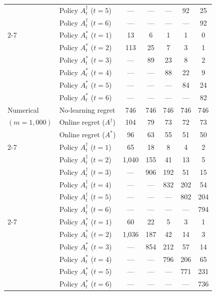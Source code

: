 \documentclass[11pt]{article}
\begin{document}
\begin{table}[h!]
\begin{tabular}{llccccc}
			&	Policy $A^\dagger_t$ ($t=5$)	&	---		&	---		&	---		&	92		&	25		\\
			&	Policy $A^\dagger_t$ ($t=6$)	&	---		&	---		&	---		&	---		&	92		\\
\cmidrule{2-7}
			&	Policy $A^*_t$ ($t=1$)	&	13		&	6		&	1		&	1		&	0		\\
			&	Policy $A^*_t$ ($t=2$)	&	113		&	25		&	7		&	3		&	1		\\
			&	Policy $A^*_t$ ($t=3$)	&	---		&	89		&	23		&	8		&	2		\\
			&	Policy $A^*_t$ ($t=4$)	&	---		&	---		&	88		&	22		&	9		\\
			&	Policy $A^*_t$ ($t=5$)	&	---		&	---		&	---		&	84		&	24		\\
			&	Policy $A^*_t$ ($t=6$)	&	---		&	---		&	---		&	---		&	82		\\
\hline
Numerical	&	No-learning regret	&	746		&	746		&	746		&	746		&	746		\\
$(m=1,000)$	&	Online regret ($A^\dagger$)		&	104		&	79		&	73		&	72		&	73		\\
	        &	Online regret ($A^*$)		&	96		&	63		&	55		&	51		&	50		\\
\cmidrule{2-7}
			&	Policy $A^\dagger_t$ ($t=1$)	&	65		&	18		&	8		&	4		&	2		\\
			&	Policy $A^\dagger_t$ ($t=2$)	&	1,040	&	155		&	41		&	13		&	5		\\
			&	Policy $A^\dagger_t$ ($t=3$)	&	---		&	906		&	192		&	51		&	15		\\
			&	Policy $A^\dagger_t$ ($t=4$)	&	---		&	---		&	832		&	202		&	54		\\
			&	Policy $A^\dagger_t$ ($t=5$)	&	---		&	---		&	---		&	802		&	204		\\
			&	Policy $A^\dagger_t$ ($t=6$)	&	---		&	---		&	---		&	---		&	794		\\
\cmidrule{2-7}
			&	Policy $A^*_t$ ($t=1$)	&	60		&	22		&	5		&	3		&	1		\\
			&	Policy $A^*_t$ ($t=2$)	&	1,036	&	187		&	42		&	14		&	3		\\
			&	Policy $A^*_t$ ($t=3$)	&	---		&	854		&	212		&	57		&	14		\\
			&	Policy $A^*_t$ ($t=4$)	&	---		&	---		&	796		&	206		&	65		\\
			&	Policy $A^*_t$ ($t=5$)	&	---		&	---		&	---		&	771		&	231		\\
			&	Policy $A^*_t$ ($t=6$)	&	---		&	---		&	---		&	---		&	736		\\
\bottomrule
\end{tabular}
\end{table}
\end{document}
